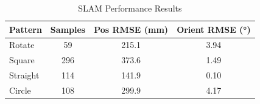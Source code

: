 \begin{table}[h]
\centering
\caption{SLAM Performance Results}
\begin{tabular}{lccc}
\hline
\textbf{Pattern} & \textbf{Samples} & \textbf{Pos RMSE (mm)} & \textbf{Orient RMSE (°)} \\
\hline
Rotate & 59 & 215.1 & 3.94 \\
Square & 296 & 373.6 & 1.49 \\
Straight & 114 & 141.9 & 0.10 \\
Circle & 108 & 299.9 & 4.17 \\
\hline
\end{tabular}
\end{table}
